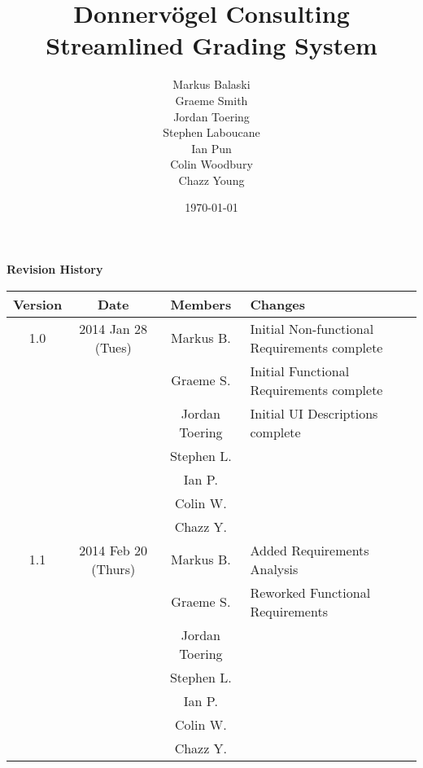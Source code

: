 \documentclass{article}
\begin{document}
\title{Donnervögel Consulting \\ Streamlined Grading System}
\author{Markus Balaski \\ Graeme Smith \\ Jordan Toering \\ Stephen Laboucane \\ Ian Pun \\ Colin Woodbury \\ Chazz Young}
\date{\today}
\maketitle
\clearpage

\textbf{Revision History}
\begin{center}
  \begin{tabular}{| c | c | c | l |}
    \hline
    Version & Date & Members & Changes\\
    \hline
    1.0 & 2014 Jan 28 (Tues) & Markus B. & Initial Non-functional Requirements complete\\
    & & Graeme S. & Initial Functional Requirements complete\\
    & & Jordan Toering & Initial UI Descriptions complete\\
    & & Stephen L. & \\
    & & Ian P. & \\
    & & Colin W. & \\
    & & Chazz Y. & \\
    \hline
    1.1 & 2014 Feb 20 (Thurs) & Markus B. & Added Requirements Analysis\\
    & & Graeme S. & Reworked Functional Requirements\\
    & & Jordan Toering & \\
    & & Stephen L. & \\
    & & Ian P. & \\
    & & Colin W. & \\
    & & Chazz Y. & \\
    \hline
  \end{tabular}
\end{center}
\clearpage

\tableofcontents
\clearpage

\end{document}
